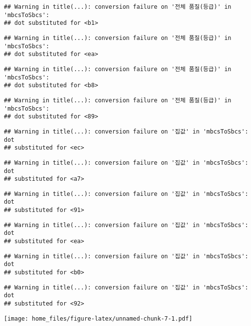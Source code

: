 \documentclass[
]{article}
\begin{document}
\begin{verbatim}
## Warning in title(...): conversion failure on '전체 품질(등급)' in 'mbcsToSbcs':
## dot substituted for <b1>
\end{verbatim}

\begin{verbatim}
## Warning in title(...): conversion failure on '전체 품질(등급)' in 'mbcsToSbcs':
## dot substituted for <ea>
\end{verbatim}

\begin{verbatim}
## Warning in title(...): conversion failure on '전체 품질(등급)' in 'mbcsToSbcs':
## dot substituted for <b8>
\end{verbatim}

\begin{verbatim}
## Warning in title(...): conversion failure on '전체 품질(등급)' in 'mbcsToSbcs':
## dot substituted for <89>
\end{verbatim}

\begin{verbatim}
## Warning in title(...): conversion failure on '집값' in 'mbcsToSbcs': dot
## substituted for <ec>
\end{verbatim}

\begin{verbatim}
## Warning in title(...): conversion failure on '집값' in 'mbcsToSbcs': dot
## substituted for <a7>
\end{verbatim}

\begin{verbatim}
## Warning in title(...): conversion failure on '집값' in 'mbcsToSbcs': dot
## substituted for <91>
\end{verbatim}

\begin{verbatim}
## Warning in title(...): conversion failure on '집값' in 'mbcsToSbcs': dot
## substituted for <ea>
\end{verbatim}

\begin{verbatim}
## Warning in title(...): conversion failure on '집값' in 'mbcsToSbcs': dot
## substituted for <b0>
\end{verbatim}

\begin{verbatim}
## Warning in title(...): conversion failure on '집값' in 'mbcsToSbcs': dot
## substituted for <92>
\end{verbatim}

\texttt{[image: home\_files/figure-latex/unnamed-chunk-7-1.pdf]}
\end{document}

